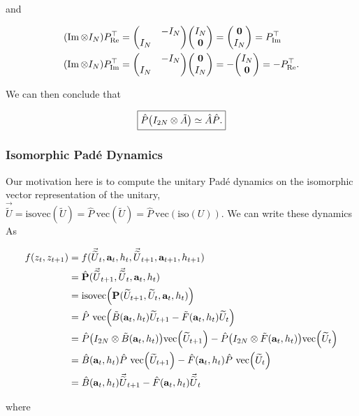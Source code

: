 \documentclass{article}
\newcommand{\isoU}{\widetilde{U}}
\newcommand{\isovecU}{\vec{\widetilde{U}}}
\newcommand{\isovec}{\text{isovec}}
\newcommand{\Pre}{P_{\text{Re}}}
\newcommand{\Pim}{P_{\text{Im}}}
\begin{document}
\noindent
and

\begin{align*}
  (\Im \otimes I_N)\Pre^\top &= \mqty(& -I_N \\ I_N &) \mqty(I_N \\ \vb{0}) = \mqty(\vb{0} \\ I_N) = \Pim^\top \\ 
  (\Im \otimes I_N)\Pim^\top &= \mqty(& -I_N \\ I_N &) \mqty(\vb{0} \\ I_N) = -\mqty(I_N \\ \vb{0}) = -\Pre^\top.
\end{align*}

\noindent
We can then conclude that

\begin{align*}
  \boxed{\hat P \qty(I_{2N} \otimes \tilde A) \simeq \hat A \hat P.}
\end{align*}

\newpage
\subsubsection*{Isomorphic Pad\'e Dynamics}
Our motivation here is to compute the unitary Pad\'e dynamics on the isomorphic vector representation of the unitary, $\isovecU = \isovec(\isoU) = \hat P \ \text{vec}(\isoU) = \hat P \ \text{vec}(\text{iso}(U))$. We can write these dynamics As

\begin{align*}
  f(z_t, z_{t+1}) &= f(\isovecU_t, \vb{a}_t, h_t, \isovecU_{t+1}, \vb{a}_{t+1}, h_{t+1}) \\
  &= \hat{\vb{P}}(\isovecU_{t+1}, \isovecU_t, \vb{a}_t, h_t) \\
  &= \isovec\qty(\vb{P}(\isoU_{t+1}, \isoU_t, \vb{a}_t, h_t)) \\
  &= \hat P \ \text{vec}\qty(\tilde B(\vb{a}_t, h_t) \isoU_{t+1} - \tilde F(\vb{a}_t, h_t) \isoU_t) \\
  &= \hat P \qty(I_{2N} \otimes \tilde B(\vb{a}_t, h_t)) \text{vec}\qty(\isoU_{t+1}) - \hat P \qty(I_{2N} \otimes \tilde F(\vb{a}_t, h_t)) \text{vec}\qty(\isoU_t) \\
  &= \hat B(\vb{a}_t, h_t) \hat P \ \text{vec}\qty(\isoU_{t+1})  - \hat F(\vb{a}_t, h_t) \hat P \ \text{vec}\qty(\isoU_t) \\
  &= \hat B(\vb{a}_t, h_t) \isovecU_{t+1} - \hat F(\vb{a}_t, h_t) \isovecU_t
\end{align*}

\noindent
where
\end{document}
